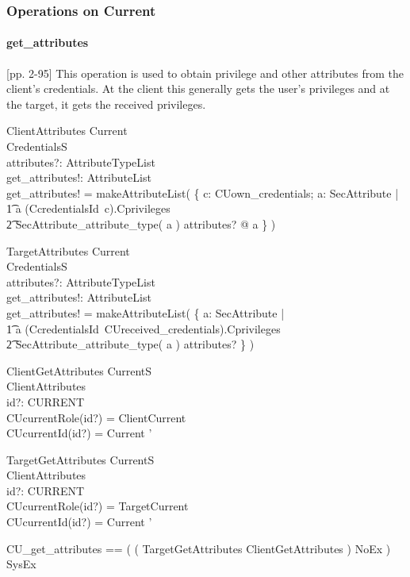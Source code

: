 \subsubsection{Operations on Current}

\paragraph{get\_attributes}
[pp. 2-95] This operation is used to obtain privilege and other attributes from
the client's credentials.  At the client this generally gets the user's
privileges and at the target, it gets the received privileges.
\begin{schema}{ClientAttributes}
  \Delta Current \\
  \Xi CredentialsS \\
  attributes?: AttributeTypeList \\
  get\_attributes!: AttributeList \\
  \where
  get\_attributes! = makeAttributeList( \{ c: \ran CUown\_credentials; a: SecAttribute | \\
  \t1 a \in (CcredentialsId~c).Cprivileges \\
  \t2 \land SecAttribute\_attribute\_type( a ) \in \ran attributes? @ a \} )
\end{schema}
\begin{schema}{TargetAttributes}
  \Delta Current \\
  \Xi CredentialsS \\
  attributes?: AttributeTypeList \\
  get\_attributes!: AttributeList \\
  \where
  get\_attributes! = makeAttributeList( \{ a: SecAttribute | \\
  \t1 a \in (CcredentialsId~CUreceived\_credentials).Cprivileges \\
  \t2 \land SecAttribute\_attribute\_type( a ) \in \ran attributes? \} )
\end{schema}
\begin{schema}{ClientGetAttributes}
  \Xi CurrentS \\
  ClientAttributes \\
  id?: CURRENT \\
  \where
  CUcurrentRole(id?) = ClientCurrent \\
  CUcurrentId(id?) = \theta Current ' \\
\end{schema}
\begin{schema}{TargetGetAttributes}
  \Xi CurrentS \\
  ClientAttributes \\
  id?: CURRENT \\
  \where
  CUcurrentRole(id?) = TargetCurrent \\
  CUcurrentId(id?) = \theta Current ' \\
\end{schema}
\begin{zed}
  CU\_get\_attributes == \< ( ( TargetGetAttributes \lor ClientGetAttributes )
  \land NoEx ) \\ \lor SysEx \> 
\end{zed}

